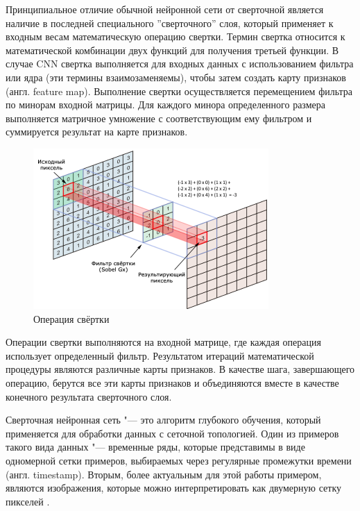 \documentclass[bachelor, och, coursework]{SCWorks}
\begin{document}
        Принципиальное отличие обычной нейронной сети от сверточной является
        наличие в последней специального ''сверточного'' слоя, который применяет
        к входным весам математическую операцию свертки. Термин свертка
        относится к математической комбинации двух функций для получения третьей
        функции. В случае CNN свертка выполняется для входных данных с
        использованием фильтра или ядра (эти термины взаимозаменяемы), чтобы
        затем создать карту признаков (англ. feature map). Выполнение свертки
        осуществляется перемещением фильтра по минорам входной матрицы. Для
        каждого минора определенного размера выполняется матричное умножение с
        соответствующим ему фильтром и суммируется результат на карте признаков. 

        \begin{figure}[H]
            \centering
            \includegraphics[width=0.8\textwidth]{pics/convolute.png}
            \caption{Операция свёртки}
        \end{figure}

        Операции свертки выполняются на входной матрице, где каждая операция
        использует определенный фильтр. Результатом итераций математической
        процедуры являются различные карты признаков. В качестве шага,
        завершающего операцию, берутся все эти карты признаков и объединяются
        вместе в качестве конечного результата сверточного слоя.

        Сверточная нейронная сеть "--- это алгоритм глубокого обучения, который
        применяется для обработки данных с сеточной топологией. Один из примеров
        такого вида данных "--- временные ряды, которые представимы в виде
        одномерной сетки примеров, выбираемых через регулярные промежутки
        времени (англ. timestamp). Вторым, более актуальным для этой работы
        примером, являются изображения, которые можно интерпретировать как
        двумерную сетку пикселей \cite{cnn2}.
\end{document}
